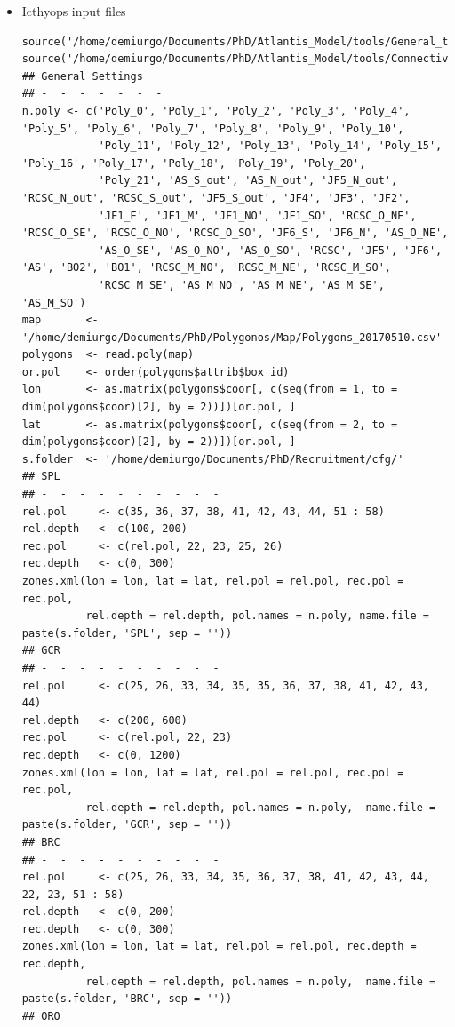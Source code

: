 \documentclass[11pt]{article}
\begin{document}
\begin{itemize}
\begin{itemize}
\item Icthyops input files\\
\label{sec-5-2-1-10-1-2}%
\begin{verbatim}
source('/home/demiurgo/Documents/PhD/Atlantis_Model/tools/General_tools/Atlantis_tools.R')
source('/home/demiurgo/Documents/PhD/Atlantis_Model/tools/Connectivity/Cnect.tools.R')
## General Settings
## -  -  -  -  -  -  -
n.poly <- c('Poly_0', 'Poly_1', 'Poly_2', 'Poly_3', 'Poly_4', 'Poly_5', 'Poly_6', 'Poly_7', 'Poly_8', 'Poly_9', 'Poly_10',
            'Poly_11', 'Poly_12', 'Poly_13', 'Poly_14', 'Poly_15', 'Poly_16', 'Poly_17', 'Poly_18', 'Poly_19', 'Poly_20',
            'Poly_21', 'AS_S_out', 'AS_N_out', 'JF5_N_out', 'RCSC_N_out', 'RCSC_S_out', 'JF5_S_out', 'JF4', 'JF3', 'JF2',
            'JF1_E', 'JF1_M', 'JF1_NO', 'JF1_SO', 'RCSC_O_NE', 'RCSC_O_SE', 'RCSC_O_NO', 'RCSC_O_SO', 'JF6_S', 'JF6_N', 'AS_O_NE',
            'AS_O_SE', 'AS_O_NO', 'AS_O_SO', 'RCSC', 'JF5', 'JF6', 'AS', 'BO2', 'BO1', 'RCSC_M_NO', 'RCSC_M_NE', 'RCSC_M_SO',
            'RCSC_M_SE', 'AS_M_NO', 'AS_M_NE', 'AS_M_SE', 'AS_M_SO')
map       <- '/home/demiurgo/Documents/PhD/Polygonos/Map/Polygons_20170510.csv'
polygons  <- read.poly(map)
or.pol    <- order(polygons$attrib$box_id)
lon       <- as.matrix(polygons$coor[, c(seq(from = 1, to = dim(polygons$coor)[2], by = 2))])[or.pol, ]
lat       <- as.matrix(polygons$coor[, c(seq(from = 2, to = dim(polygons$coor)[2], by = 2))])[or.pol, ]
s.folder  <- '/home/demiurgo/Documents/PhD/Recruitment/cfg/'
## SPL
## -  -  -  -  -  -  -  -  -  -
rel.pol     <- c(35, 36, 37, 38, 41, 42, 43, 44, 51 : 58)
rel.depth   <- c(100, 200)
rec.pol     <- c(rel.pol, 22, 23, 25, 26)
rec.depth   <- c(0, 300)
zones.xml(lon = lon, lat = lat, rel.pol = rel.pol, rec.pol = rec.pol,
          rel.depth = rel.depth, pol.names = n.poly, name.file = paste(s.folder, 'SPL', sep = ''))
## GCR
## -  -  -  -  -  -  -  -  -  -
rel.pol     <- c(25, 26, 33, 34, 35, 35, 36, 37, 38, 41, 42, 43, 44)
rel.depth   <- c(200, 600)
rec.pol     <- c(rel.pol, 22, 23)
rec.depth   <- c(0, 1200)
zones.xml(lon = lon, lat = lat, rel.pol = rel.pol, rec.pol = rec.pol,
          rel.depth = rel.depth, pol.names = n.poly,  name.file = paste(s.folder, 'GCR', sep = ''))
## BRC
## -  -  -  -  -  -  -  -  -  -
rel.pol     <- c(25, 26, 33, 34, 35, 36, 37, 38, 41, 42, 43, 44, 22, 23, 51 : 58)
rel.depth   <- c(0, 200)
rec.depth   <- c(0, 300)
zones.xml(lon = lon, lat = lat, rel.pol = rel.pol, rec.depth = rec.depth,
          rel.depth = rel.depth, pol.names = n.poly,  name.file = paste(s.folder, 'BRC', sep = ''))
## ORO

\end{verbatim}
\end{itemize}
\end{itemize}
\end{document}
